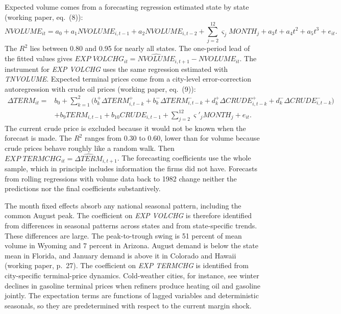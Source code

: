 Expected volume comes from a forecasting regression estimated state by state (working paper, eq.~(8)):
\begin{equation}\label{eq:13-bs-volforecast}
\textit{NVOLUME}_{it}=a_0+a_1\textit{NVOLUME}_{i,t-1}+a_2\textit{NVOLUME}_{i,t-2}+\sum_{j=2}^{12}\varsigma_j\textit{MONTH}_j
+a_3t+a_4t^2+a_5t^3+e_{it}.
\end{equation}
The $R^2$ lies between 0.80 and 0.95 for nearly all states. The one-period lead of the fitted values gives
$\textit{EXP VOLCHG}_{it}=\widehat{\textit{NVOLUME}}_{i,t+1}-\textit{NVOLUME}_{it}$. The instrument for
\textit{EXP VOLCHG} uses the same regression estimated with \textit{TNVOLUME}. Expected terminal prices come
from a city-level error-correction autoregression with crude oil prices (working paper, eq.~(9)):
\begin{equation}\label{eq:13-bs-termforecast}
\begin{aligned}
\Delta\textit{TERM}_{it}={}&b_0+\sum_{k=1}^{2}\big(b^{+}_k\Delta\textit{TERM}^{+}_{i,t-k}+b^{-}_k\Delta\textit{TERM}^{-}_{i,t-k}
+d^{+}_k\Delta\textit{CRUDE}^{+}_{i,t-k}+d^{-}_k\Delta\textit{CRUDE}^{-}_{i,t-k}\big)\\
&+b_9\textit{TERM}_{i,t-1}+b_{10}\textit{CRUDE}_{i,t-1}+\sum_{j=2}^{12}\varsigma'_j\textit{MONTH}_j+e_{it}.
\end{aligned}
\end{equation}
The current crude price is excluded because it would not be known when the forecast is made. The $R^2$ ranges
from 0.30 to 0.60, lower than for volume because crude prices behave roughly like a random walk. Then
$\textit{EXP TERMCHG}_{it}=\widehat{\Delta\textit{TERM}}_{i,t+1}$. The forecasting coefficients use the whole
sample, which in principle includes information the firms did not have. Forecasts from rolling regressions
with volume data back to 1982 change neither the predictions nor the final coefficients substantively.

The month fixed effects absorb any national seasonal pattern, including the common August peak. The
coefficient on \textit{EXP VOLCHG} is therefore identified from differences in seasonal patterns across states
and from state-specific trends. These differences are large. The peak-to-trough swing is 51 percent of mean
volume in Wyoming and 7 percent in Arizona. August demand is below the state mean in Florida, and January
demand is above it in Colorado and Hawaii (working paper, p.~27). The coefficient on \textit{EXP TERMCHG} is
identified from city-specific terminal-price dynamics. Cold-weather cities, for instance, see winter declines
in gasoline terminal prices when refiners produce heating oil and gasoline jointly. The expectation terms are
functions of lagged variables and deterministic seasonals, so they are predetermined with respect to the
current margin shock.

